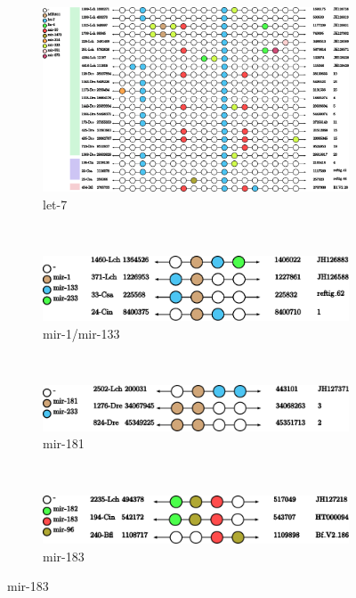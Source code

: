 \documentclass[11pt]{article}
\begin{document}
\begin{figure}[ht!]
\centering
    \begin{subfigure}[t]{1\textwidth}
        \centering
        \includegraphics[height=9 cm]{Cluster_images/let-7_101_128}
        \caption{let-7}
    \end{subfigure}
    \\
    \begin{subfigure}[t]{0.45\textwidth}
        \centering
        \includegraphics[height=1.2 cm]{Cluster_images/mir-1_119_33}
        \caption{mir-1/mir-133}
     \end{subfigure}
        ~
     \\
    \begin{subfigure}[t]{0.45\textwidth}
        \centering
        \includegraphics[height=1.2 cm]{Cluster_images/mir-181_105_2502}
        \caption{mir-181}
       \end{subfigure}
        ~
         \begin{subfigure}[t]{0.45\textwidth}
        \centering
        \includegraphics[height=1.2 cm]{Cluster_images/mir-183_132_240}
        \caption{mir-183}
    \end{subfigure}

\end{figure}
\end{document}
